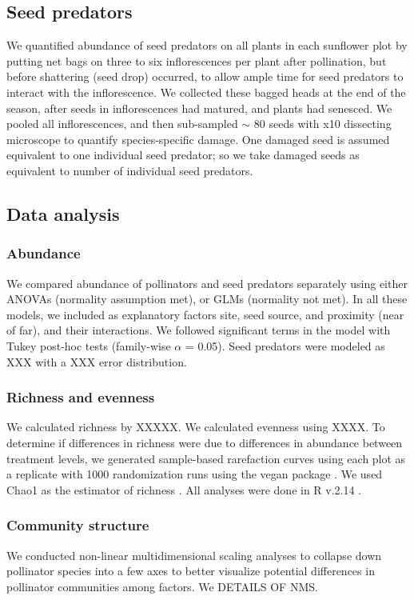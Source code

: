 \documentclass[12pt]{article}
\begin{document}
\subsection{Seed predators}
We quantified abundance of seed predators on all plants in each sunflower plot by putting net bags on three to six inflorescences per plant after pollination, but before shattering (seed drop) occurred, to allow ample time for seed predators to interact with the inflorescence.  We collected these bagged heads at the end of the season, after seeds in inflorescences had matured, and plants had senesced. We pooled all inflorescences, and then sub-sampled $\sim$ 80 seeds with x10 dissecting microscope to quantify species-specific damage.  One damaged seed is assumed equivalent to one individual seed predator; so we take damaged seeds as equivalent to number of individual seed predators. 

\subsection{Data analysis}
\subsubsection{Abundance}  
We compared abundance of pollinators and seed predators separately using either ANOVAs (normality assumption met), or GLMs (normality not met).  In all these models, we included as explanatory factors site, seed source, and proximity (near of far), and their interactions.  We followed significant terms in the model with Tukey post-hoc tests (family-wise $\alpha$ = 0.05).  Seed predators were modeled as XXX with a XXX error distribution.  

\subsubsection{Richness and evenness}
We calculated richness by XXXXX.  We calculated evenness using XXXX.  To determine if differences in richness were due to differences in abundance between treatment levels, we generated sample-based rarefaction curves using each plot as a replicate with 1000 randomization runs using the vegan package \citep{Oksanen2010}.  We used Chao1 as the estimator of richness \citep{Chao1984}.  All analyses were done in R v.2.14 \citep*{Team2008}.

\subsubsection{Community structure}
We conducted non-linear multidimensional scaling analyses to collapse down pollinator species into a few axes to better visualize potential differences in pollinator communities among factors.  We DETAILS OF NMS.
\end{document}
